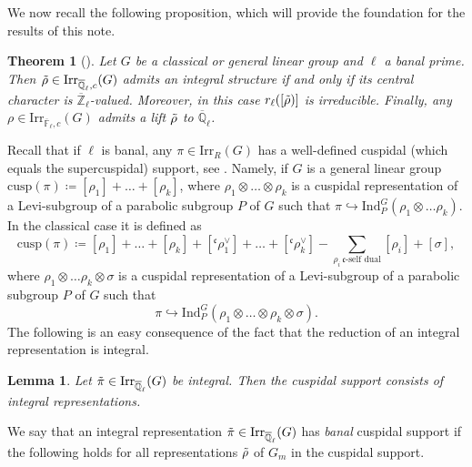 \documentclass[10pt,a4paper]{article}
\newtheorem{theorem}{Theorem}
\newtheorem{lemma}{Lemma}
\theoremstyle{remark}
\theoremstyle{definition}
\newcommand{\fl}{{\overline{\mathbb{F}}_\ell}}
\newcommand{\ql}{{\overline{\mathbb{Q}}_\ell}}
\newcommand{\zl}{{\overline{\mathbb{Z}}_\ell}}
\newcommand{\ip}{\mathrm{Ind}_P^G}
\newcommand{\tpi}{\Tilde{\pi}}
\newcommand{\trho}{{\Tilde{\rho}}}
\newcommand{\irr}{\mathrm{Irr}}
\newcommand{\rl}{r_\ell}
\newcommand{\hra}{\hookrightarrow}
\newcommand{\cusp}{\mathrm{cusp}}
\newcommand{\fc}{\mathfrak{c}}
\begin{document}
We now recall the following proposition, which will provide the foundation for the results of this note.
\begin{theorem}[{\cite[Proposition 4.15]{Dat_Helm_Kurinczuk_Moss_2024}}]\label{T:cuslift}
    Let $G$ be a classical or general linear group and $\ell$ a banal prime.
    Then $\trho\in\irr_{\ql,c}(G)$ admits an integral structure if and only if its central character is $\zl$-valued. Moreover, in this case $\rl([\trho)]$ is irreducible.
    Finally, any $\rho\in\irr_{\fl,c}(G)$ admits a lift $\trho$ to $\ql$.
\end{theorem}
Recall that if $\ell$ is banal, any $\pi\in\irr_R(G)$ has a well-defined cuspidal (which equals the supercuspidal) support, see \cite[II 2.20]{Vig96}. Namely, if $G$ is a general linear group $\cusp(\pi)\coloneqq [\rho_1]+\ldots+[\rho_k]$, where $\rho_1\otimes\ldots\otimes\rho_k$ is a cuspidal representation of a Levi-subgroup of a parabolic subgroup $P$ of $G$
such that $\pi\hra \ip(\rho_1\otimes\ldots\rho_k)$.
In the classical case it is defined as \[\cusp(\pi)\coloneqq [\rho_1]+\ldots+[\rho_k]+[{}^\fc\rho_1^\lor]+\ldots+[{}^\fc\rho_k^\lor]-\sum_{\rho_i\,\fc\text{-self dual}}[\rho_i]+[\sigma],\] where $\rho_1\otimes\ldots\rho_k\otimes\sigma$ is a cuspidal representation of a Levi-subgroup of a parabolic subgroup $P$ of $G$
such that
\[\pi\hra \ip(\rho_1\otimes\ldots\otimes\rho_k\otimes\sigma).\]
The following is an easy consequence of the fact that the reduction of an integral representation is integral.
\begin{lemma}
    Let $\tpi\in\irr_\ql(G)$ be integral. Then the cuspidal support consists of integral representations.
\end{lemma}
We say that an integral representation $\tpi\in\irr_\ql(G)$ has \emph{banal} cuspidal support if the following holds for all representations $\trho$ of $G_m$ in the cuspidal support.
\end{document}
